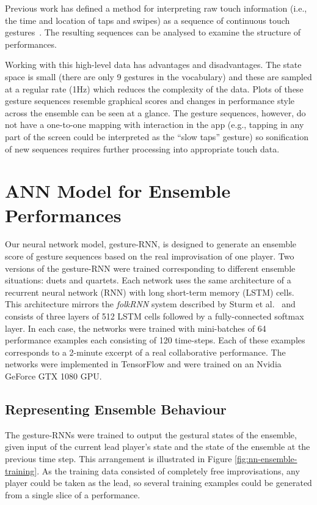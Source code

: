 \documentclass[sigchi]{acmart} %
\begin{document}
Previous work has defined a method for interpreting raw touch
information (i.e., the time and location of taps and swipes) as a
sequence of continuous touch gestures~\cite{Martin:2015jk}. The
resulting sequences can be analysed to examine the structure of
performances.

Working with this high-level data has advantages and disadvantages.
The state space is small (there are only 9 gestures in the vocabulary)
and these are sampled at a regular rate (1Hz) which reduces the
complexity of the data. Plots of these gesture sequences resemble
graphical scores and changes in performance style across the ensemble
can be seen at a glance. The gesture sequences, however, do not have a
one-to-one mapping with interaction in the app (e.g., tapping in any
part of the screen could be interpreted as the ``slow taps'' gesture)
so sonification of new sequences requires further processing into
appropriate touch data.

\section{ANN Model for Ensemble Performances}

Our neural network model, gesture-RNN, is designed to generate an
ensemble score of gesture sequences based on the real improvisation of
one player. Two versions of the gesture-RNN were trained corresponding
to different ensemble situations: duets and quartets. Each network
uses the same architecture of a recurrent neural network (RNN) with
long short-term memory (LSTM) cells. This architecture mirrors the
\emph{folkRNN} system described by Sturm et al.~\cite{Sturm:2016rz}
and consists of three layers of 512 LSTM cells followed by a
fully-connected softmax layer. In each case, the networks were trained
with mini-batches of 64 performance examples each consisting of 120
time-steps. Each of these examples corresponds to a 2-minute excerpt
of a real collaborative performance. The networks were implemented in
TensorFlow and were trained on an Nvidia GeForce
GTX 1080 GPU.

\subsection{Representing Ensemble Behaviour}

The gesture-RNNs were trained to output the gestural states of the
ensemble, given input of the current lead player's state and the state
of the ensemble at the previous time step. This arrangement is
illustrated in Figure \ref{fig:nn-ensemble-training}. As the training
data consisted of completely free improvisations, any player could be
taken as the lead, so several training examples could be generated from
a single slice of a performance.
\end{document}
